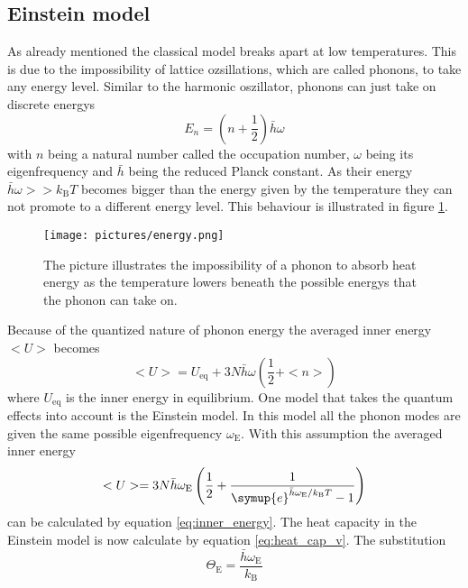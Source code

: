 \subsection{Einstein model}
As already mentioned the classical model breaks apart at low temperatures.
This is due to the impossibility of lattice ozsillations, which are called phonons, to take any energy level.
Similar to the harmonic oszillator, phonons can just take on discrete energys
\begin{equation}
    E_n = (n +\frac{1}{2})\bar{h}\omega
\end{equation}
with $n$ being a natural number called the occupation number, $\omega$ being its eigenfrequency and $\bar{h}$ being the reduced Planck constant.
As their energy $\bar{h}\omega>>k_\text{B}T$ becomes bigger than the energy given by the temperature they can not promote to a different energy level.
This behaviour is illustrated in figure \ref{fig:energy_phonon}.
\begin{figure}
    \centering
    \texttt{[image: pictures/energy.png]}
    \caption{The picture illustrates the impossibility of a phonon to absorb heat energy as the temperature lowers beneath the possible energys that the phonon can take on.}
    \label{fig:energy_phonon}
\end{figure}
Because of the quantized nature of phonon energy the averaged inner energy $<U>$ becomes
\begin{equation}
    <U> = U_\text{eq} + 3N\bar{h}\omega(\frac{1}{2} + <n>)
    \label{eq:inner_energy}
\end{equation}
where $U_\text{eq}$ is the inner energy in equilibrium.
One model that takes the quantum effects into account is the Einstein model.
In this model all the phonon modes are given the same possible eigenfrequency $\omega_\text{E}$.
With this assumption the averaged inner energy 
\begin{equation}
    <U> = 3N\bar{h}\omega_\text{E} \left ( \frac{1}{2} + \frac{1}{\symup{e}^{\bar{h}\omega_\text{E}/k_\text{B}T} - 1}\right )
\end{equation}
can be calculated by equation \eqref{eq:inner_energy}.
The heat capacity in the Einstein model is now calculate by equation \eqref{eq:heat_cap_v}.
The substitution 
\begin{equation}
    \Theta_\text{E} = \frac{\bar{h}\omega_\text{E}}{k_\text{B}}
\end{equation}